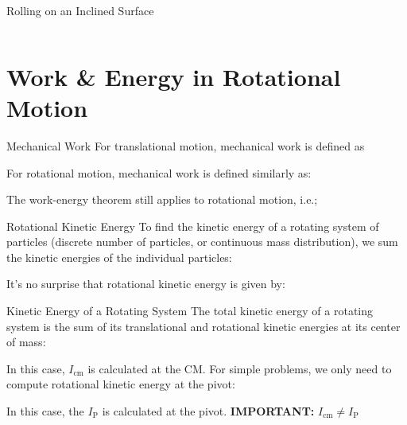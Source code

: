 \documentclass[12pt,compress,aspectratio=169]{beamer}
\begin{document}
\begin{frame}{Rolling on an Inclined Surface}
\begin{columns}
  \end{columns}
\end{frame}



\section{Work \& Energy in Rotational Motion}

\begin{frame}{Mechanical Work}
  For translational motion, mechanical work is defined as


  For rotational motion, mechanical work is defined similarly as:


  The work-energy theorem still applies to rotational motion, i.e.;

\end{frame}



\begin{frame}{Rotational Kinetic Energy}
  To find the kinetic energy of a rotating system of particles (discrete number
  of particles, or continuous mass distribution), we sum the
  kinetic energies of the individual particles:
    
  
  It's no surprise that rotational kinetic energy is given by:
  
\end{frame}



\begin{frame}{Kinetic Energy of a Rotating System}
  The total kinetic energy of a rotating system is the sum of its translational
  and rotational kinetic energies at its center of mass:

  
  In this case, $I_\text{cm}$ is calculated at the CM. For simple problems, we
  only need to compute rotational kinetic energy at the pivot:

  
  In this case, the $I_\text{P}$ is calculated at the pivot.
  \textbf{IMPORTANT:} $I_\text{cm}\neq I_\text{P}$
\end{frame}
\end{document}
